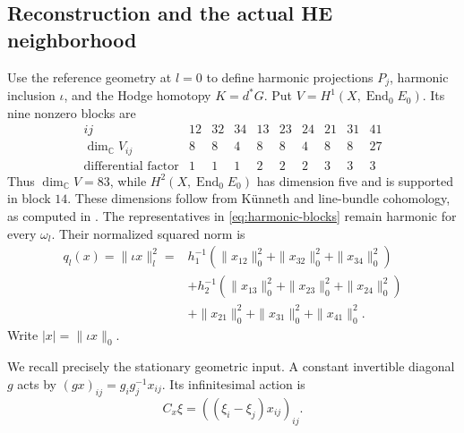 \documentclass[11pt]{amsart}
\theoremstyle{definition}
\theoremstyle{remark}
\newcommand{\CC}{\mathbb C}
\newcommand{\End}{\operatorname{End}}
\begin{document}
\subsection{Reconstruction and the actual HE neighborhood}
Use the reference geometry at $l=0$ to define harmonic projections
$P_j$, harmonic inclusion $\iota$, and the Hodge homotopy $K=d^*G$.
Put $V=H^1(X,\End_0E_0)$. Its nine nonzero blocks are
\begin{equation}\label{eq:harmonic-blocks}
\begin{array}{c|ccc|ccc|ccc}
 ij&12&32&34&13&23&24&21&31&41\\ \hline
 \dim_{\CC}V_{ij}&8&8&4&8&8&4&8&8&27\\
 \text{differential factor}&1&1&1&2&2&2&3&3&3
\end{array}
\end{equation}
Thus $\dim_{\CC}V=83$, while $H^2(X,\End_0E_0)$ has dimension five
and is supported in block $14$. These dimensions follow from
K\"unneth and line-bundle cohomology, as computed in
\cite[Sections 3 and 5]{WuebbenWall26}. The representatives in
\eqref{eq:harmonic-blocks} remain harmonic for every $\omega_l$.
Their normalized squared norm is
\begin{equation}\label{eq:harmonic-norm}
 \begin{split}
 q_l(x)=\|\iota x\|_l^2={}&
 h_1^{-1}(\|x_{12}\|_0^2+\|x_{32}\|_0^2+\|x_{34}\|_0^2)\\
 &+h_2^{-1}(\|x_{13}\|_0^2+\|x_{23}\|_0^2+\|x_{24}\|_0^2)\\
 &+\|x_{21}\|_0^2+\|x_{31}\|_0^2+\|x_{41}\|_0^2.
 \end{split}
\end{equation}
Write $|x|=\|\iota x\|_0$.

We recall precisely the stationary geometric input. A constant
invertible diagonal $g$ acts by $(gx)_{ij}=g_i g_j^{-1}x_{ij}$.
Its infinitesimal action is
\begin{equation}\label{eq:orbit-map}
 C_x\xi=((\xi_i-\xi_j)x_{ij})_{ij}.
\end{equation}
\end{document}
